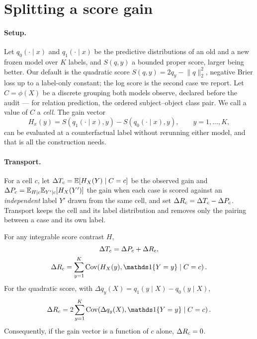 \section{Splitting a score gain}\label{sec:method}

\paragraph{Setup.}\label{sec:setup} Let $q_0(\cdot\mid x)$ and $q_1(\cdot\mid x)$ be the
predictive distributions of an old and a new frozen model over $K$ labels, and $S(q,y)$ a
bounded proper score, larger being better. Our default is the quadratic score
$S(q,y)=2q_y-\lVert q\rVert_2^2$, negative Brier loss up to a label-only constant; the log
score is the second case we report. Let $C=\phi(X)$ be a discrete grouping both models
observe, declared before the audit --- for relation prediction, the ordered subject--object
class pair. We call a value of $C$ a \emph{cell}. The gain vector
\begin{equation}
H_x(y)=S(q_1(\cdot\mid x),y)-S(q_0(\cdot\mid x),y),\qquad y=1,\ldots,K,
\label{eq:gain-vector}
\end{equation}
can be evaluated at a counterfactual label without rerunning either model, and that is all
the construction needs.

\paragraph{Transport.} For a cell $c$, let $\Delta T_c=\mathbb E[H_X(Y)\mid C=c]$ be the observed
gain and $\Delta P_c=\mathbb E_{H\mid c}\mathbb E_{Y'\mid c}[H_X(Y')]$ the gain when each case is
scored against an \emph{independent} label $Y'$ drawn from the same cell, and set
$\Delta R_c=\Delta T_c-\Delta P_c$. Transport keeps the cell and its label distribution and removes only
the pairing between a case and its own label.

\begin{theorem}\label{thm:population}
For any integrable score contrast $H$,
\begin{gather}
\dT_c=\dP_c+\dR_c,\notag\\
\dR_c=\sum_{y=1}^K\operatorname{Cov}\!\left(H_X(y),\ind\{Y=y\}\mid C=c\right).
\label{eq:population-id}
\end{gather}
For the quadratic score, with $\Delta q_y(X)=q_1(y\mid X)-q_0(y\mid X)$,
\begin{equation}
\dR_c=2\sum_{y=1}^K\operatorname{Cov}\!\left(\Delta q_y(X),\ind\{Y=y\}\mid C=c\right).
\label{eq:cov-id}
\end{equation}
Consequently, if the gain vector is a function of $c$ alone, $\Delta R_c=0$.
\end{theorem}

